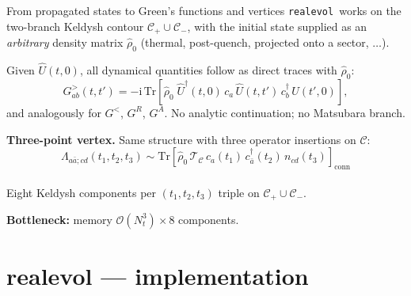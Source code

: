 \documentclass[10pt,aspectratio=169]{beamer}
\newcommand{\Lam}{\Lambda}
\newcommand{\realevol}{\texttt{realevol}}
\begin{document}
\begin{frame}{From propagated states to Green's functions and vertices}
    \small
    \realevol\ works on the two-branch Keldysh contour
    $\mathcal{C}_+\cup\mathcal{C}_-$, with the initial state supplied as
    an \emph{arbitrary} density matrix $\hat\rho_0$ (thermal,
    post-quench, projected onto a sector, $\dots$).

    \medskip
    Given $\hat U(t,0)$, all dynamical quantities follow as
    direct traces with $\hat\rho_0$:
    \[
    G^>_{ab}(t,t') = -\mathrm{i}\,
    \mathrm{Tr}\!\left[\hat\rho_0\;
    \hat U^\dagger(t,0)\,c_a\,\hat U(t,t')\,c_b^\dagger\,\hat U(t',0)
    \right],
    \]
    and analogously for $G^<$, $G^R$, $G^A$. No analytic continuation;
    no Matsubara branch.

    \medskip
    \textbf{Three-point vertex.} Same structure with three operator
    insertions on $\mathcal{C}$:
    \[
    \Lam_{a\bar a;cd}(t_1,t_2,t_3) \sim
    \mathrm{Tr}\!\left[\hat\rho_0\,\mathcal{T}_\mathcal{C}\,
    c_a(t_1)\,c^\dagger_{\bar a}(t_2)\,
    n_{cd}(t_3)\right]_{\text{conn}}
    \]
    \\
    Eight Keldysh components per $(t_1,t_2,t_3)$ triple on
    $\mathcal{C}_+\cup\mathcal{C}_-$.

    \medskip
    \textbf{Bottleneck:} memory $\mathcal{O}(N_t^3)\times 8$ components.
\end{frame}

\section{realevol — implementation}
\end{document}
